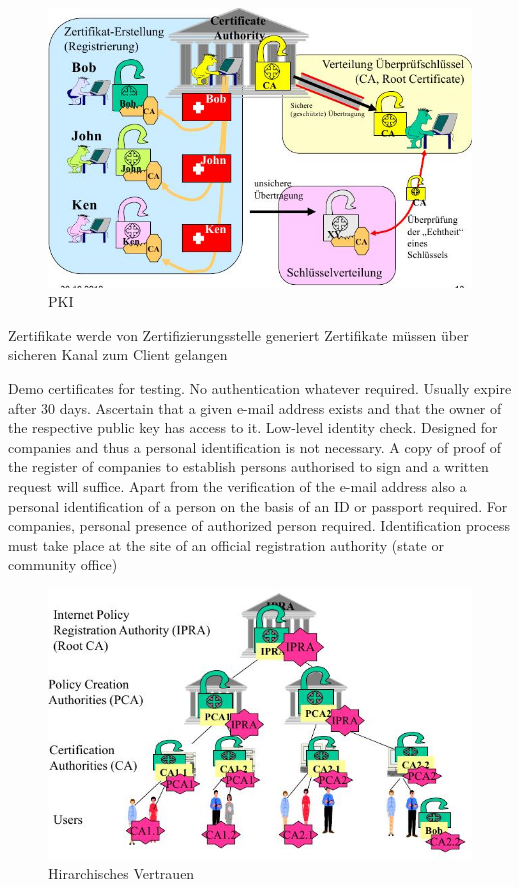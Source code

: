 \documentclass[ngerman,a4paper,12pt]{scrreprt}
\begin{document}
\begin{figure}[H]
	\centering
	\includegraphics[width=\textwidth]{img/V7.4.jpg}
	\caption{PKI}
	\label{}
\end{figure}

\ul
	\li Zertifikate werde von Zertifizierungsstelle generiert
	\li Zertifikate müssen über sicheren Kanal zum Client gelangen
\ulE

\dl
	 Demo certificates for testing. No authentication whatever required.
Usually expire after 30 days.
	 Ascertain that a given e-mail address exists and that the owner of the respective
public key has access to it. Low-level identity check.
	 Designed for companies and thus a personal identification is not necessary. A copy
of proof of the register of companies to establish persons authorised to sign and a
written request will suffice.
	 Apart from the verification of the e-mail address also a personal identification of a
person on the basis of an ID or passport required.
For companies, personal presence of authorized person required.
	 Identification process must take place at the site of an official registration
authority (state or community office)
\dlE

\begin{figure}[H]
	\centering
	\includegraphics[width=\textwidth]{img/V7.5.jpg}
	\caption{Hirarchisches Vertrauen}
	\label{}
\end{figure}
\end{document}
